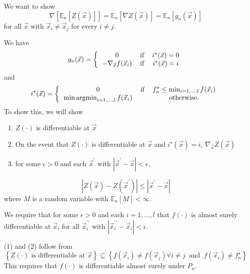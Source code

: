 \documentclass[phd,tocprelim]{cornell}
\DeclareMathOperator*{\argmin}{argmin}
\begin{document}
We want to show
\begin{equation}
    \nabla \left[\mathbb{E}_{n}\left[Z \left(\vec{x}\right)\right]\right] = \mathbb{E}_{n}\left[\nabla Z \left(\vec{x}\right)\right] =  \mathbb{E}_{n}\left[g_{n}(\vec{x})\right]
\end{equation}
for all $\vec{x}$ with $\vec{x}_{i} \neq \vec{x}_{j}$ for every $i \neq j$.

We have
\begin{equation}
    g_{n}(\vec{x}) = \left\{ \begin{tabular}{ccc}
        0 & if & $i^{\star}(\vec{x}) = 0$ \\
        $-\nabla_{\vec{x}} f(\vec{x}_{i})$ & if & $i^{\star}(\vec{x}) = i$
    \end{tabular} \right.
\end{equation}
and
\begin{equation}
    i^{\star}(\vec{x}) = \left\{ \begin{tabular}{ccc}
        0 & if & $f_{n}^{\star} \leq \min_{i=1,\ldots,l} f(\vec{x}_{i})$ \\
        $\min \argmin_{i=1,\ldots,l} f(\vec{x}_{i})$ & & otherwise.
    \end{tabular} \right.
\end{equation}
To show this, we will show
\begin{enumerate}
    \item $Z(\cdot)$ is differentiable at $\vec{x}$
    \item On the event that $Z(\cdot)$ is differentiable at $\vec{x}$ and $i^{\star}(\vec{x}) = i$, $\nabla_{\vec{x}} Z(\vec{x})$
    \item for some $\epsilon > 0$ and each $\vec{x}^{\prime}$ with $|\vec{x}^{\prime} - \vec{x}| < \epsilon$,
\end{enumerate}
\begin{equation}
    \left|Z(\vec{x}) - Z(\vec{x}^{\prime})\right| \leq \left|\vec{x}^{\prime} - \vec{x}\right|
\end{equation}
where $M$ is a random variable with $\mathbb{E}_{n}\left[M\right] < \infty$.

We require that for some $\epsilon > 0$ and each $i = 1, \ldots, l$ that $f(\cdot)$ is almost surely differentiable at $\vec{x}_{i}$ for all $\vec{x}_{i}^{\prime\prime}$ with $|\vec{x}_{i}^{\prime\prime} - \vec{x}_{i}| < \epsilon$.

(1) and (2) follow from
\begin{equation}
    \left\{Z(\cdot) \text{ is differentiable at } \vec{x}\right\} \subseteq \left\{f(\vec{x}_{i}) \neq f(\vec{x}_{j}) \forall i \neq j \ \text{ and } \ f(\vec{x}_{i}) \neq f_{n}^{\star} \right\}
\end{equation}
This requires that $f(\cdot)$ is differentiable almost surely under $P_{n}$.
\end{document}
